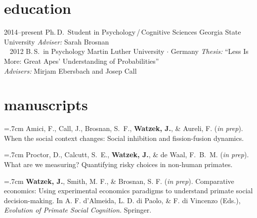 \documentclass[]{friggeri-cv}
\begin{document}
\section{education}

\begin{entrylist}
  \entry
    {2014--present}
    {Ph.\,D.~Student in Psychology\,/\,Cognitive Sciences}
    {Georgia State University}
    {\emph{Adviser:} Sarah Brosnan\\~}
  \entry
    {2012}
    {B.\,S.~in Psychology}
    {Martin Luther University $\cdot$ Germany}
    {\emph{Thesis:} ``Less Is More: Great Apes' Understanding of Probabilities''\\
    \emph{Advisers:} Mirjam Ebersbach and Josep Call}
\end{entrylist}

%

\section{manuscripts}

\hangindent=.7cm Amici, F., Call, J., Brosnan, S.~F., \textbf{Watzek, J.}, \& Aureli, F. (\emph{in prep}). When the social context changes: Social inhibition and fission-fusion dynamics.

\hangindent=.7cm Proctor, D., Calcutt, S.~E., \textbf{Watzek, J.}, \& de Waal, F.~B.~M. (\emph{in prep}). What are we measuring? Quantifying risky choices in non-human primates.

\hangindent=.7cm \textbf{Watzek, J.}, Smith, M. F., \& Brosnan, S. F. (\emph{in prep}). Comparative economics: Using experimental economics paradigms to understand primate social decision-making. In A. F. d'Almeida, L. D. di Paolo, \& F. di Vincenzo (Eds.), \emph{Evolution of Primate Social Cognition.} Springer.

\end{document}
